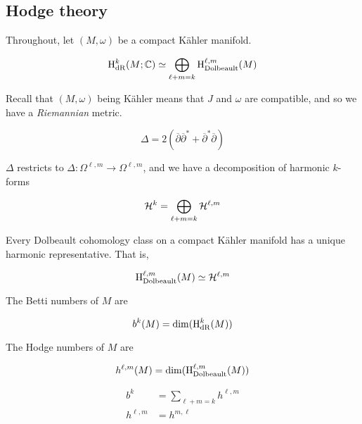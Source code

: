 \subsection{Hodge theory}

Throughout, let \((M, \omega)\) be a compact K\"ahler manifold.

\begin{theorem}

    \[\mathrm{H}_\mathrm{dR}^k(M; \mathbb{C}) \simeq \bigoplus_{\ell + m = k}\mathrm{H}_\mathrm{Dolbeault}^{\ell, m}(M)\]

\end{theorem}

Recall that \((M, \omega)\) being K\"ahler means that \(J\) and \(\omega\) are compatible, and so we have a \emph{Riemannian} metric.

\begin{proposition}
    \[\Delta = 2(\overline\partial\overline\partial^* + \overline\partial^*\overline\partial)\]
\end{proposition}

\begin{corollary}
    \(\Delta\) restricts to \(\Delta : \Omega^{\ell, m} \to \Omega^{\ell, m}\), and we have a decomposition of harmonic \(k\)-forms

    \[\mathcal{H}^k = \bigoplus_{\ell + m = k}\mathcal{H}^{\ell, m}\]
\end{corollary}

\begin{theorem}
    [Hodge] Every Dolbeault cohomology class on a compact K\"ahler manifold has a unique harmonic representative. That is, 

    \[\mathrm{H}_\mathrm{Dolbeault}^{\ell, m}(M) \simeq \mathcal{H}^{\ell, m}\]
\end{theorem}

\begin{definition}
     The Betti numbers of \(M\) are

    \[b^k(M) = \dim(\mathrm{H}_\mathrm{dR}^k(M))\]
\end{definition}

\begin{definition}
     The Hodge numbers of \(M\) are

    \[h^{\ell, m}(M) = \dim(\mathrm{H}_\mathrm{Dolbeault}^{\ell, m}(M))\]
\end{definition}

\begin{proposition}
    \begin{align*}
        b^k &= \sum_{\ell + m = k}h^{\ell, m} \\
        h^{\ell, m} &= h^{m, \ell} \\
    \end{align*}
\end{proposition}
